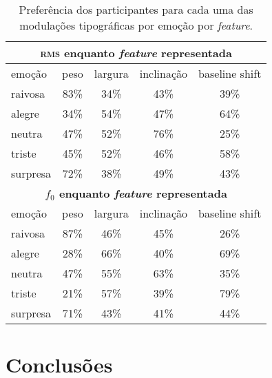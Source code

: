\documentclass[11pt]{article}
\begin{document}
\begin{table}
    \begin{tabular*}{\linewidth}{lcccc}
        \toprule
        \multicolumn{5}{c}{ \textbf{\textsc{rms} enquanto {\itshape feature} representada} }     \\
        \midrule
        emoção & peso & largura & inclinação & baseline shift  \\
        \midrule
        raivosa       & 83\% & 34\% & 43\% & 39\% \\
        alegre        & 34\% & 54\% & 47\% & 64\% \\
        neutra        & 47\% & 52\% & \cellcolor[HTML]{9ef7cd}76\% & 25\% \\
        triste        & 45\% & 52\% & 46\% & 58\% \\
        surpresa      & \cellcolor[HTML]{9ef7cd}72\% & 38\% & 49\% & 43\% \\
        \midrule
        \multicolumn{5}{c}{ \textbf{$f_0$ enquanto {\itshape feature} representada} }      \\
        \midrule
        emoção & peso & largura & inclinação & baseline shift  \\
        \midrule
        raivosa       & \cellcolor[HTML]{9ef7cd}87\% & 46\% & 45\% & 26\% \\
        alegre        & 28\% & 66\% & 40\% & \cellcolor[HTML]{9ef7cd}69\% \\
        neutra        & 47\% & 55\% & 63\% & 35\% \\
        triste        & 21\% & 57\% & 39\% & \cellcolor[HTML]{9ef7cd}79\% \\
        surpresa      & 71\% & 43\% & 41\% & 44\% \\
        \bottomrule
    \end{tabular*}
    \caption{Preferência dos participantes para cada uma das modulações tipográficas por emoção por {\itshape feature}. }
    \label{tab:type_perf}
\end{table}
  
  

\section{Conclus\~{o}es}
  \label{sec:conclusoes}

  

   
\end{document}
